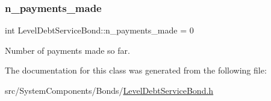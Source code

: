 \subsubsection{\texorpdfstring{n\+\_\+payments\+\_\+made}{n\_payments\_made}}
{\footnotesize\ttfamily int Level\+Debt\+Service\+Bond\+::n\+\_\+payments\+\_\+made = 0\hspace{0.3cm}{\ttfamily [private]}}



Number of payments made so far. 



The documentation for this class was generated from the following file\+:\begin{DoxyCompactItemize}
\item 
src/\+System\+Components/\+Bonds/\mbox{\hyperlink{LevelDebtServiceBond_8h}{Level\+Debt\+Service\+Bond.\+h}}\end{DoxyCompactItemize}

